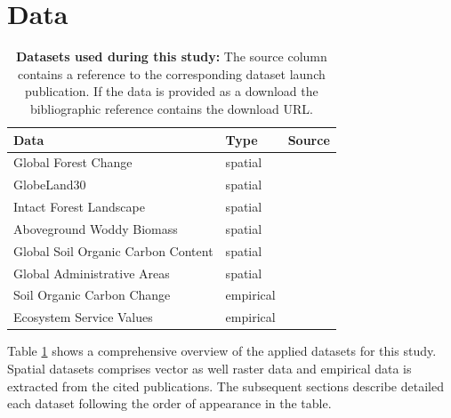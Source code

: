 \section{Data}
\label{sec:data}
	\begin{table}[ht]
		\centering
		\caption[Datasets used during this study]{\textbf{Datasets used during this study:} The source column contains a reference to the corresponding dataset launch publication. If the data is provided as a download the bibliographic reference contains the download URL.}
		\label{tab:datasets}
		\begin{tabular}{lll}
			\hline
			Data & Type & Source \\\hline
			Global Forest Change & spatial & \citet{Hansen2013}\\
			GlobeLand30 & spatial & \citet{Chen2015}\\
			Intact Forest Landscape & spatial & \citet{Potapov2017}\\
			Aboveground Woddy Biomass & spatial & \citet{Baccini2015}\\
			Global Soil Organic Carbon Content & spatial & \citet{FAO2018}\\
			Global Administrative Areas & spatial & \\
			Soil Organic Carbon Change & empirical & \citet{Don2010}\\
			\multirow{3}{*}{Ecosystem Service Values} & \multirow{3}{*}{empirical} & \citet{Groot2012}\\
			&& \citet{Costanza2014}\\
			&& \citet{Siikamaki2015}\\\hline
		\end{tabular}
	\end{table}
	Table \ref{tab:datasets} shows a comprehensive overview of the applied datasets for this study. Spatial datasets comprises vector as well raster data and empirical data is extracted from the cited publications. The subsequent sections describe detailed each dataset following the order of appearance in the table.  

